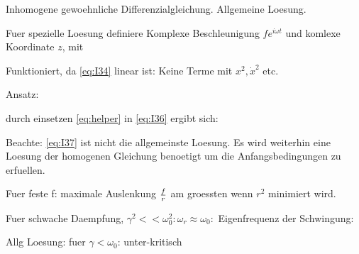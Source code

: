 

Inhomogene gewoehnliche Differenzialgleichung. Allgemeine Loesung.



Fuer spezielle Loesung definiere Komplexe Beschleunigung $f e^{i \omega t}$ und komlexe Koordinate $z$, mit

Funktioniert, da \ref{eq:I34} linear ist: Keine Terme mit $x^2, \dot x^2$ etc.

Ansatz:


durch einsetzen \ref{eq:helper} in \ref{eq:I36} ergibt sich:


Beachte: \ref{eq:I37} ist nicht die allgemeinste Loesung. Es wird weiterhin eine Loesung der homogenen Gleichung benoetigt um die Anfangsbedingungen zu erfuellen.

Fuer feste f: maximale Auslenkung ${f \over r}$ am groessten wenn $r^2$ minimiert wird.



Fuer schwache Daempfung, $\gamma^2 << \omega_0^2: \omega_r \approx \omega_0:$ Eigenfrequenz der Schwingung:

Allg Loesung: fuer $\gamma < \omega_0$: unter-kritisch

